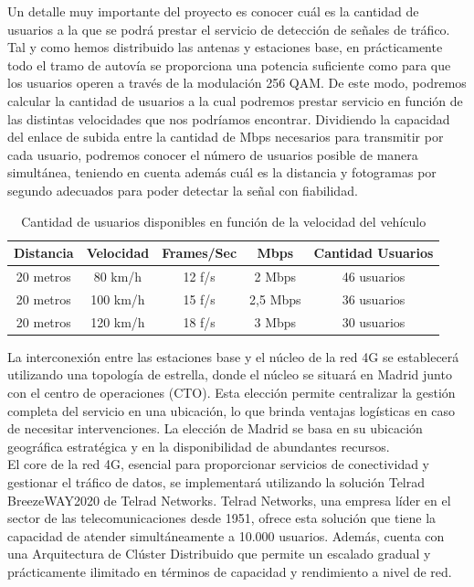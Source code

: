 Un detalle muy importante del proyecto es conocer cuál es la cantidad de usuarios a la que se podrá prestar el servicio de detección de señales de tráfico. Tal y como hemos distribuido las antenas y estaciones base, en prácticamente todo el tramo  de autovía se proporciona una potencia suficiente como para que los usuarios operen a través de la modulación 256 QAM. De este modo, podremos calcular la cantidad de usuarios a la cual podremos prestar servicio en función de las distintas velocidades que nos podríamos encontrar.  Dividiendo la capacidad del enlace de subida entre la cantidad de Mbps necesarios para transmitir por cada usuario, podremos conocer el número de usuarios posible de manera simultánea, teniendo en cuenta además cuál es la distancia y fotogramas por segundo adecuados para poder detectar la señal con fiabilidad.

\begin{table}[H]
\centering
\begin{tabular}{|c|c|c|c|c|}
\hline
\textbf{Distancia} & \textbf{Velocidad} & \textbf{Frames/Sec} & \textbf{Mbps} & \textbf{Cantidad Usuarios} \\ \hline \hline
20 metros          & 80 km/h            & 12 f/s              & 2 Mbps        & 46 usuarios                \\ \hline
20 metros          & 100 km/h           & 15 f/s              & 2,5 Mbps      & 36 usuarios                \\ \hline
20 metros          & 120 km/h           & 18 f/s              & 3 Mbps        & 30 usuarios                \\ \hline
\end{tabular}
\caption{Cantidad de usuarios disponibles en función de la velocidad del vehículo }
\label{users}
\end{table}

La interconexión entre las estaciones base y el núcleo de la red 4G se establecerá utilizando una topología de estrella, donde el núcleo se situará en Madrid junto con el centro de operaciones (CTO). Esta elección permite centralizar la gestión completa del servicio en una ubicación, lo que brinda ventajas logísticas en caso de necesitar intervenciones. La elección de Madrid se basa en su ubicación geográfica estratégica y en la disponibilidad de abundantes recursos.\\

El core de la red 4G, esencial para proporcionar servicios de conectividad y gestionar el tráfico de datos, se implementará utilizando la solución Telrad BreezeWAY2020 de Telrad Networks. Telrad Networks, una empresa líder en el sector de las telecomunicaciones desde 1951, ofrece esta solución que tiene la capacidad de atender simultáneamente a 10.000 usuarios. Además, cuenta con una Arquitectura de Clúster Distribuido que permite un escalado gradual y prácticamente ilimitado en términos de capacidad y rendimiento a nivel de red.\\

